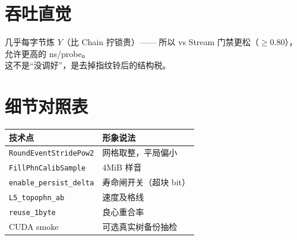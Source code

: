 \section{吞吐直觉}

几乎每字节炼 $Y$（比 Chain 拧锁贵）—— 所以 vs Stream 门禁更松（$\ge0.80$），允许更高的 ns/probe。\\
这不是``没调好''，是去掉指纹铃后的结构税。

\section{细节对照表}

\begin{center}
\small
\begin{tabular}{@{}lp{6.8cm}@{}}
\toprule
技术点 & 形象说法 \\
\midrule
\texttt{RoundEventStridePow2} & 网格取整，平局偏小 \\
\texttt{FillPhnCalibSample} & 4MiB 样音 \\
\texttt{enable\_persist\_delta} & 寿命闸开关（超块 bit） \\
\texttt{L5\_topophn\_ab} & 速度及格线 \\
\texttt{reuse\_1byte} & 良心重合率 \\
CUDA smoke & 可选真实树备份抽检 \\
\bottomrule
\end{tabular}
\end{center}
